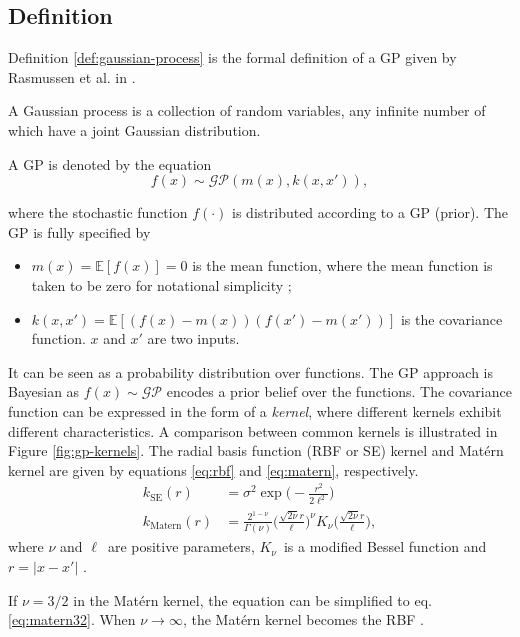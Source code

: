 \subsection{Definition}

Definition \ref{def:gaussian-process} is the formal definition of a GP given by Rasmussen et al. in \cite{Rasmussen2006}.
\begin{definition} \label{def:gaussian-process}
    A Gaussian process is a collection of random variables, any infinite number of which have a joint Gaussian distribution.
\end{definition}

A GP is denoted by the equation
\begin{equation} \label{eq:GP-eq1}
    f(x) \sim \mathcal{GP}(m(x), k(x, x')),
\end{equation}

where the stochastic function $f(\cdot)$ is distributed according to a GP (prior).
The GP is fully specified by
\begin{itemize}
    \item $m(x) = \mathbb{E}[f(x)] = 0$ is the mean function, where the mean function is taken to be zero for notational simplicity \cite{Rasmussen2006};
    \item $k(x, x') = \mathbb{E}[(f(x) - m(x))(f(x') - m(x'))]$ is the covariance function.
    $x$ and $x'$ are two inputs.
\end{itemize}
It can be seen as a probability distribution over functions.
The GP approach is Bayesian as \(f(x) \sim \mathcal{GP}\) encodes a prior belief over the functions.
The covariance function can be expressed in the form of a \textit{kernel}, where different kernels exhibit different characteristics.
A comparison between common kernels is illustrated in Figure \ref{fig:gp-kernels}.
The radial basis function (RBF or SE) kernel and Matérn kernel are given by equations \ref{eq:rbf} and \ref{eq:matern}, respectively.
\begin{align}
k_{\textrm{SE}}(r) &= \sigma^2 \exp{\Big(-\frac{r^2}{2\ell^2}\Big)} \label{eq:rbf} \\
k_{\textrm{Matern}}(r) &= \frac{2^{1-\nu}}{\Gamma(\nu)} \Big(\frac{\sqrt{2\nu}r}{\ell}\Big)^\nu K_\nu\Big(\frac{\sqrt{2\nu}r}{\ell}\Big), \label{eq:matern}
\end{align}
where $\nu$ and $\ell$ are positive parameters, $K_\nu$ is a modified Bessel function and $r = |x-x'|$ \cite{Rasmussen2006}.

If $\nu = 3/2$ in the Matérn kernel, the equation can be simplified to eq. \ref{eq:matern32}.
When $\nu \rightarrow \infty$, the Matérn kernel becomes the RBF \cite{Rasmussen2006}.

